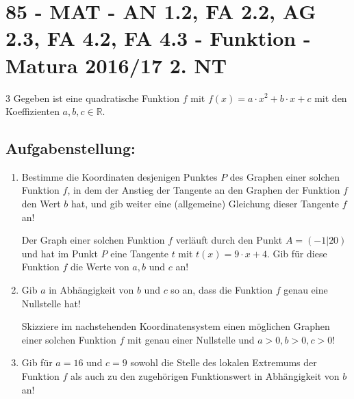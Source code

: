 \section{85 - MAT - AN 1.2, FA 2.2, AG 2.3, FA 4.2, FA 4.3 - Funktion - Matura 2016/17 2. NT}

\begin{langesbeispiel} \item[3] %
						Gegeben ist eine quadratische Funktion $f$ mit $f(x)=a\cdot x^2+b\cdot x+c$ mit den Koeffizienten $a,b,c\in\mathbb{R}$.

				\subsection{Aufgabenstellung:}
\begin{enumerate}
	\item Bestimme die Koordinaten desjenigen Punktes $P$ des Graphen einer solchen Funktion $f$, in dem der Anstieg der Tangente an den Graphen der Funktion $f$ den Wert $b$ hat, und gib weiter eine (allgemeine) Gleichung dieser Tangente $f$ an!
	
	Der Graph einer solchen Funktion $f$ verläuft durch den Punkt $A=(-1|20)$ und hat im Punkt $P$ eine Tangente $t$ mit $t(x)=9\cdot x+4$. Gib für diese Funktion $f$ die Werte von $a,b$ und $c$ an! 
	
	\item Gib $a$ in Abhängigkeit von $b$ und $c$ so an, dass die Funktion $f$ genau eine Nullstelle hat!
	
	Skizziere im nachstehenden Koordinatensystem einen möglichen Graphen einer solchen Funktion $f$ mit genau einer Nullstelle und $a>0, b>0, c>0$!
	
	\begin{center}
	\end{center}
	
	\item {} Gib für $a=16$ und $c=9$ sowohl die Stelle des lokalen Extremums der Funktion $f$ als auch zu den zugehörigen Funktionswert in Abhängigkeit von $b$ an!
	

\end{enumerate}
\end{langesbeispiel}

